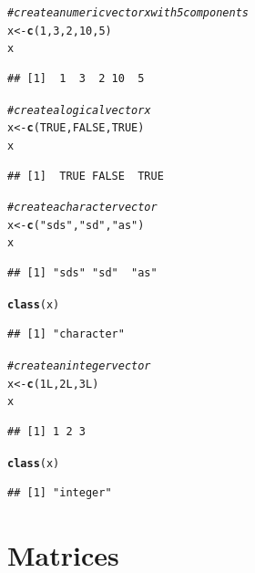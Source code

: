 \documentclass[english,nohyper]{tufte-book}\usepackage[]{graphicx}\usepackage[]{color}
\makeatletter
\newcommand{\hlnum}[1]{\textcolor[rgb]{0.686,0.059,0.569}{#1}}%
\newcommand{\hlstr}[1]{\textcolor[rgb]{0.192,0.494,0.8}{#1}}%
\newcommand{\hlcom}[1]{\textcolor[rgb]{0.678,0.584,0.686}{\textit{#1}}}%
\newcommand{\hlstd}[1]{\textcolor[rgb]{0.345,0.345,0.345}{#1}}%
\newcommand{\hlkwb}[1]{\textcolor[rgb]{0.69,0.353,0.396}{#1}}%
\newcommand{\hlkwd}[1]{\textcolor[rgb]{0.737,0.353,0.396}{\textbf{#1}}}%
\newenvironment{kframe}{%
 \def\at@end@of@kframe{}%
 \ifinner\ifhmode%
  \def\at@end@of@kframe{\end{minipage}}%
  \begin{minipage}{\columnwidth}%
 \fi\fi%
 \def\FrameCommand##1{\hskip\@totalleftmargin \hskip-\fboxsep
 \colorbox{shadecolor}{##1}\hskip-\fboxsep
     \hskip-\linewidth \hskip-\@totalleftmargin \hskip\columnwidth}%
 \MakeFramed {\advance\hsize-\width
   \@totalleftmargin\z@ \linewidth\hsize
   \@setminipage}}%
 {\par\unskip\endMakeFramed%
 \at@end@of@kframe}
\newenvironment{knitrout}{}{} %
\makeatother
\begin{document}
\begin{knitrout}
\color{fgcolor}\begin{kframe}
\begin{alltt}
\hlcom{# create a numeric vector x with 5 components}
\hlstd{x} \hlkwb{<-} \hlkwd{c}\hlstd{(}\hlnum{1}\hlstd{,} \hlnum{3}\hlstd{,} \hlnum{2}\hlstd{,} \hlnum{10}\hlstd{,} \hlnum{5}\hlstd{)}
\hlstd{x}
\end{alltt}
\begin{verbatim}
## [1]  1  3  2 10  5
\end{verbatim}
\begin{alltt}
\hlcom{# create a logical vector x}
\hlstd{x} \hlkwb{<-} \hlkwd{c}\hlstd{(}\hlnum{TRUE}\hlstd{,} \hlnum{FALSE}\hlstd{,} \hlnum{TRUE}\hlstd{)}
\hlstd{x}
\end{alltt}
\begin{verbatim}
## [1]  TRUE FALSE  TRUE
\end{verbatim}
\begin{alltt}
\hlcom{# create a character vector}
\hlstd{x} \hlkwb{<-} \hlkwd{c}\hlstd{(}\hlstr{"sds"}\hlstd{,} \hlstr{"sd"}\hlstd{,} \hlstr{"as"}\hlstd{)}
\hlstd{x}
\end{alltt}
\begin{verbatim}
## [1] "sds" "sd"  "as"
\end{verbatim}
\begin{alltt}
\hlkwd{class}\hlstd{(x)}
\end{alltt}
\begin{verbatim}
## [1] "character"
\end{verbatim}
\begin{alltt}
\hlcom{# create an integer vector}
\hlstd{x} \hlkwb{<-} \hlkwd{c}\hlstd{(}\hlnum{1L}\hlstd{,} \hlnum{2L}\hlstd{,} \hlnum{3L}\hlstd{)}
\hlstd{x}
\end{alltt}
\begin{verbatim}
## [1] 1 2 3
\end{verbatim}
\begin{alltt}
\hlkwd{class}\hlstd{(x)}
\end{alltt}
\begin{verbatim}
## [1] "integer"
\end{verbatim}
\end{kframe}
\end{knitrout}



\section{Matrices}
\end{document}
